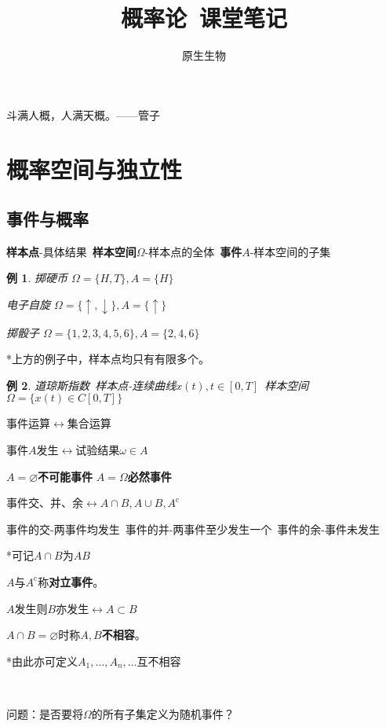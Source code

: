 \documentclass[a4paper,UTF8,fontset=windows]{ctexart}
\title{\heiti 概率论\ 课堂笔记}
\author{原生生物}
\date{}
\newtheorem{exmp}{例}[section]
\begin{document}
\maketitle
\begin{center}
\Large 斗满人概，人满天概。——管子
\end{center}
\tableofcontents

\newpage

\section{概率空间与独立性}
\subsection{事件与概率}
\textbf{样本点}-具体结果\ \textbf{样本空间}$\Omega$-样本点的全体\ \textbf{事件}$A$-样本空间的子集

\begin{exmp}
掷硬币 $\Omega=\{H,T\},A=\{H\}$

电子自旋 $\Omega=\{\uparrow,\downarrow\},A=\{\uparrow\}$

掷骰子 $\Omega=\{1,2,3,4,5,6\},A=\{2,4,6\}$
\end{exmp}

*上方的例子中，样本点均只有有限多个。

\begin{exmp}
道琼斯指数\ 样本点-连续曲线$x(t),t\in[0,T]$\ 样本空间$\Omega=\{x(t)\in C[0,T]\}$
\end{exmp}

事件运算$\longleftrightarrow$集合运算

事件$A$发生$\longleftrightarrow$试验结果$\omega\in A$

$A=\varnothing$\textbf{不可能事件} $A=\Omega$\textbf{必然事件}

事件交、并、余$\longleftrightarrow A\cap B,A\cup B,A^\mathrm{c}$

事件的交-两事件均发生\ 事件的并-两事件至少发生一个\ 事件的余-事件未发生

*可记$A\cap B$为$AB$

$A$与$A^\mathrm{c}$称\textbf{对立事件}。

$A$发生则$B$亦发生$\longleftrightarrow A\subset B$

$A\cap B=\varnothing$时称$A,B$\textbf{不相容}。

*由此亦可定义$A_1,\dots,A_n,\dots$互不相容

~

问题：是否要将$\Omega$的所有子集定义为随机事件？
\end{document}
